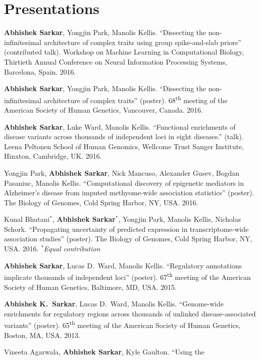 \documentclass{article}
\begin{document}
\section*{Presentations}
\begin{henum}
\item \textbf{Abhishek Sarkar}, Yongjin Park, Manolis Kellis. ``Dissecting the
  non-infinitesimal architecture of complex traits using group spike-and-slab
  priors'' (contributed talk). Workshop on Machine Learning in Computational
  Biology, Thirtieth Annual Conference on Neural Information Processing
  Systems, Barcelona, Spain. 2016.
\item \textbf{Abhishek Sarkar}, Yongjin Park, Manolis Kellis. ``Dissecting the
  non-infinitesimal architecture of complex traits'' (poster).
  68\textsuperscript{th} meeting of the American Society of Human Genetics,
  Vancouver, Canada. 2016.
\item \textbf{Abhishek Sarkar}, Luke Ward, Manolis Kellis. ``Functional
  enrichments of disease variants across thousands of independent loci in eight
  diseases.'' (talk). Leena Peltonen School of Human Genomics, Wellcome Trust
  Sanger Institute, Hinxton, Cambridge, UK. 2016.
\item Yongjin Park, \textbf{Abhishek Sarkar}, Nick Mancuso, Alexander Gusev,
  Bogdan Pasaniuc, Manolis Kellis. ``Computational discovery of epigenetic
  mediators in Alzheimer’s disease from imputed methyome-wide association
  statistics'' (poster). The Biology of Genomes, Cold Spring Harbor, NY, USA.
  2016.
\item Kunal Bhutani$^*$, \textbf{Abhishek Sarkar}$^*$, Yongjin Park, Manolis
  Kellis, Nicholas Schork. ``Propagating uncertainty of predicted expression in
  transcriptome-wide association studies'' (poster). The Biology of Genomes,
  Cold Spring Harbor, NY, USA. 2016. \emph{$^*$Equal contribution}
\item \textbf{Abhishek Sarkar}, Lucas D.\ Ward, Manolis Kellis.
  ``Regulatory annotations implicate thousands of independent loci'' (poster).
  67\textsuperscript{th} meeting of the American Society of Human Genetics,
  Baltimore, MD, USA. 2015.
\item \textbf{Abhishek K.\ Sarkar}, Lucas D.\ Ward, Manolis
  Kellis. ``Genome-wide enrichments for regulatory regions across thousands of
  unlinked disease-associated variants'' (poster). 65\textsuperscript{th}
  meeting of the American Society of Human Genetics, Boston, MA, USA. 2013.
\item Vineeta Agarwala, \textbf{Abhishek Sarkar}, Kyle Gaulton. ``Using the

\end{henum}
\end{document}
